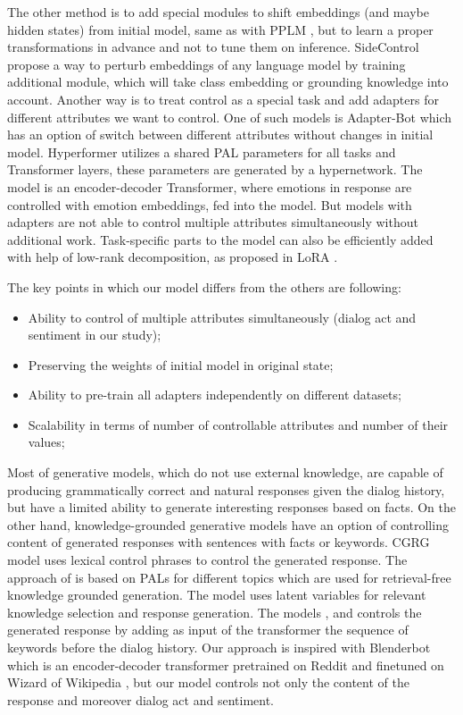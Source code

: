 \documentclass[11pt]{article}
\begin{document}
The other method is to add special modules to shift embeddings (and maybe hidden states) from initial model, same as with PPLM \cite{pplm}, but to learn a proper transformations in advance and not to tune them on inference. SideControl \cite{side_control} propose a way to perturb embeddings of any language model by training additional module, which will take class embedding or grounding knowledge into account. Another way is to treat control as a special task and add adapters \cite{houlsby2019parameterefficient} for different attributes we want to control. One of such models is Adapter-Bot \cite{madotto2020adapterbot} which has an option of switch between different attributes without changes in initial model. Hyperformer \cite{mahabadi2021parameter} utilizes a shared PAL parameters for all tasks and Transformer layers, these parameters are generated by a hypernetwork. The model \cite{xie2021empathetic} is an encoder-decoder Transformer, where emotions in response are controlled with emotion embeddings, fed into the model. But models with adapters are not able to control multiple attributes simultaneously without additional work. Task-specific parts to the model can also be efficiently added with help of low-rank decomposition, as proposed in LoRA \cite{lora}.

The key points in which our model differs from the others are following:

\begin{itemize}
    \item Ability to control of multiple attributes simultaneously (dialog act and sentiment in our study);
    \item Preserving the weights of initial model in original state;
    \item Ability to pre-train all adapters independently on different datasets;
    \item Scalability in terms of number of controllable attributes and number of their values;
\end{itemize}

Most of generative models, which do not use external knowledge, are capable of producing grammatically correct and natural responses given the dialog history, but have a limited ability to generate interesting responses based on facts. On the other hand, knowledge-grounded generative models have an option of controlling content of generated responses with sentences with facts or keywords. CGRG \cite{wu2021controllable} model uses lexical control phrases to control the generated response. The approach of \cite{xu2021retrieval} is based on PALs for different topics which are used for retrieval-free knowledge grounded generation. The model \cite{zhan2021colv} uses latent variables for relevant knowledge selection and response generation. The models \cite{xu2021generating}, \cite{kumar2021controllable} and \cite{gupta2020controlling} controls the generated response by adding as input of the transformer the sequence of keywords before the dialog history. Our approach is inspired with Blenderbot \cite{roller2020recipes} which is an encoder-decoder transformer pretrained on Reddit and finetuned on Wizard of Wikipedia \cite{dinan2018wizard}, but our model controls not only the content of the response and moreover dialog act and sentiment.
\end{document}
